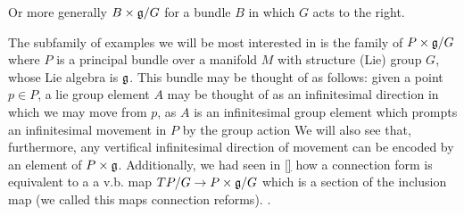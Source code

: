 Or more generally $B \times \mathfrak{g} / G$ for a bundle $B$ in which $G$ acts to the right.

The subfamily of examples we will be most interested in is the family of $P \times \mathfrak{g}/G$ where $P$ is a principal bundle over a manifold $M$ with structure (Lie) group $G$, whose Lie  algebra is $\mathfrak{g}$. This bundle may be thought of as follows: given a point $p \in P$, a lie group element $A$ may be thought of as an infinitesimal direction in which we may move from $p$, as $A$ is an infinitesimal group element which prompts an infinitesimal movement in $P$ by the group action We will also see that, furthermore, any vertifical infinitesimal direction of movement can be encoded by an element of $P \times \mathfrak{g}$. Additionally, we had seen in \ref{} how a connection form is equivalent to a  a v.b. map $TP/G \to P \times \mathfrak{g}/G$ which is a section of the inclusion map (we called this maps connection reforms). .


